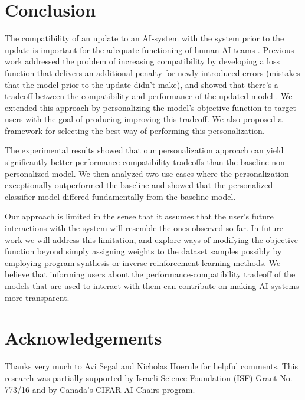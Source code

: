 \documentclass[letterpaper]{article} %
\theoremstyle{definition}
\begin{document}
\section{Conclusion}
%
The compatibility of an update to an AI-system with the system prior to the update is important for the adequate functioning of human-AI teams \cite{bansal2019beyond, bansal2019updates}. Previous work addressed the problem of increasing compatibility by developing a loss function that delivers an additional penalty for newly introduced errors (mistakes that the model prior to the update didn’t make), and showed that there's a tradeoff between the compatibility and performance of the updated model \cite{bansal2019updates}. We extended this approach by personalizing the model's objective function to target users with the goal of producing improving this tradeoff. We also proposed a framework for selecting the best way of performing this personalization.
 
The experimental results showed that our personalization approach can yield significantly better performance-compatibility tradeoffs than the baseline non-personalized model.
We then analyzed two use cases where the personalization exceptionally outperformed the baseline and showed that the personalized classifier model differed fundamentally from the baseline model.

Our approach is limited in the sense that it assumes that the user's future interactions with the system will resemble the ones observed so far.
In future work we will address this limitation, and explore ways of modifying the objective function beyond simply assigning weights to the dataset samples possibly by employing program synthesis or inverse reinforcement learning methods. We believe that informing users  about the   performance-compatibility tradeoff  of the models that are used to interact with them can  contribute on making AI-systems more transparent.



\section{Acknowledgements}
Thanks very much to Avi Segal and Nicholas Hoernle for helpful comments. This research was partially supported by Israeli Science Foundation (ISF) Grant No. 773/16 and by Canada's CIFAR AI Chairs program.



\end{document}
